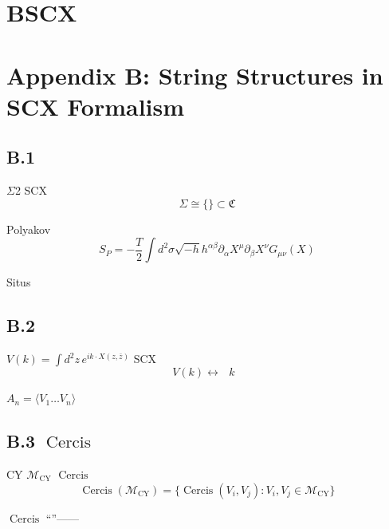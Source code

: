 \documentclass[12pt,a4paper]{article}
\theoremstyle{plain}
\theoremstyle{definition}
\newcommand{\M}{\mathcal{M}}
\newcommand{\ClaimSpace}{\mathfrak{C}}
\DeclareMathOperator{\Cercis}{Cercis}
\begin{document}
\section{BSCX }
\section*{Appendix B: String Structures in SCX Formalism}

\subsection{B.1 }

 $\Sigma$2 SCX 
\begin{equation}
    \Sigma \cong \{\text{}\} \subset \ClaimSpace
\end{equation}

Polyakov 
\begin{equation}
    S_P = -\frac{T}{2} \int d^2\sigma \sqrt{-h} h^{\alpha\beta} \partial_\alpha X^\mu \partial_\beta X^\nu G_{\mu\nu}(X)
\end{equation}

 Situs 

\subsection{B.2 }

 $V(k) = \int d^2z \, e^{ik\cdot X(z,\bar{z})}$  SCX 
\begin{equation}
    V(k) \longleftrightarrow \text{ $k$ }
\end{equation}

 $A_n = \langle V_1 \ldots V_n \rangle$ 

\subsection{B.3  $\Cercis$ }

 CY  $\M_{\text{CY}}$ $\Cercis$ 
\begin{equation}
    \Cercis(\M_{\text{CY}}) = \{
    \Cercis(V_i, V_j) : V_i, V_j \in \M_{\text{CY}}
    \}
\end{equation}

$\Cercis$ ``''——

\newpage

\end{document}
